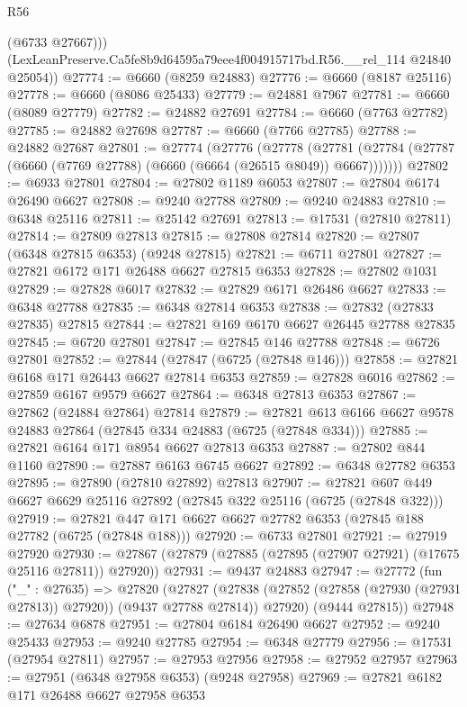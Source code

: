 \begin{lexlean}{R56}
\begin{coremodule}
          (@6733 @27667)))
      (LexLeanPreserve.Ca5fe8b9d64595a79eee4f004915717bd.R56.__rel_114 @24840 @25054))
@27774 := @6660 (@8259 @24883)
@27776 := @6660 (@8187 @25116)
@27778 := @6660 (@8086 @25433)
@27779 := @24881 @7967
@27781 := @6660 (@8089 @27779)
@27782 := @24882 @27691
@27784 := @6660 (@7763 @27782)
@27785 := @24882 @27698
@27787 := @6660 (@7766 @27785)
@27788 := @24882 @27687
@27801 := @27774
    (@27776
      (@27778
        (@27781 (@27784 (@27787 (@6660 (@7769 @27788) (@6660 (@6664 (@26515 @8049)) @6667)))))))
@27802 := @6933 @27801
@27804 := @27802 @1189 @6053
@27807 := @27804 @6174 @26490 @6627
@27808 := @9240 @27788
@27809 := @9240 @24883
@27810 := @6348 @25116
@27811 := @25142 @27691
@27813 := @17531 (@27810 @27811)
@27814 := @27809 @27813
@27815 := @27808 @27814
@27820 := @27807 (@6348 @27815 @6353) (@9248 @27815)
@27821 := @6711 @27801
@27827 := @27821 @6172 @171 @26488 @6627 @27815 @6353
@27828 := @27802 @1031
@27829 := @27828 @6017
@27832 := @27829 @6171 @26486 @6627
@27833 := @6348 @27788
@27835 := @6348 @27814 @6353
@27838 := @27832 (@27833 @27835) @27815
@27844 := @27821 @169 @6170 @6627 @26445 @27788 @27835
@27845 := @6720 @27801
@27847 := @27845 @146 @27788
@27848 := @6726 @27801
@27852 := @27844 (@27847 (@6725 (@27848 @146)))
@27858 := @27821 @6168 @171 @26443 @6627 @27814 @6353
@27859 := @27828 @6016
@27862 := @27859 @6167 @9579 @6627
@27864 := @6348 @27813 @6353
@27867 := @27862 (@24884 @27864) @27814
@27879 := @27821 @613 @6166 @6627 @9578 @24883 @27864 (@27845 @334 @24883 (@6725 (@27848 @334)))
@27885 := @27821 @6164 @171 @8954 @6627 @27813 @6353
@27887 := @27802 @844 @1160
@27890 := @27887 @6163 @6745 @6627
@27892 := @6348 @27782 @6353
@27895 := @27890 (@27810 @27892) @27813
@27907 := @27821 @607 @449 @6627 @6629 @25116 @27892 (@27845 @322 @25116 (@6725 (@27848 @322)))
@27919 := @27821 @447 @171 @6627 @6627 @27782 @6353 (@27845 @188 @27782 (@6725 (@27848 @188)))
@27920 := @6733 @27801
@27921 := @27919 @27920
@27930 := @27867 (@27879 (@27885 (@27895 (@27907 @27921) (@17675 @25116 @27811)) @27920))
@27931 := @9437 @24883
@27947 := @27772
    (fun ("_" : @27635) =>
    @27820
      (@27827
        (@27838 (@27852 (@27858 (@27930 (@27931 @27813)) @27920)) (@9437 @27788 @27814))
        @27920)
      (@9444 @27815))
@27948 := @27634 @6878
@27951 := @27804 @6184 @26490 @6627
@27952 := @9240 @25433
@27953 := @9240 @27785
@27954 := @6348 @27779
@27956 := @17531 (@27954 @27811)
@27957 := @27953 @27956
@27958 := @27952 @27957
@27963 := @27951 (@6348 @27958 @6353) (@9248 @27958)
@27969 := @27821 @6182 @171 @26488 @6627 @27958 @6353

\end{coremodule}
\end{lexlean}
